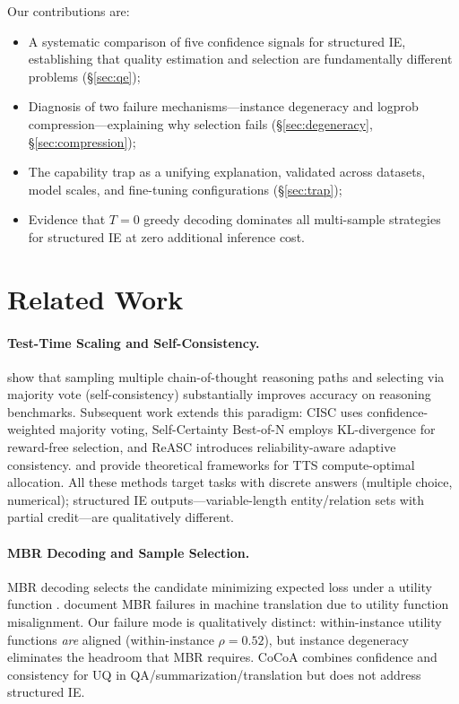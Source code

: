 \documentclass[11pt,twocolumn]{article}
\begin{document}
Our contributions are:
\begin{itemize}
\item A systematic comparison of five confidence signals for structured IE, establishing that quality estimation and selection are fundamentally different problems (\S\ref{sec:qe});
\item Diagnosis of two failure mechanisms---instance degeneracy and logprob compression---explaining why selection fails (\S\ref{sec:degeneracy}, \S\ref{sec:compression});
\item The capability trap as a unifying explanation, validated across datasets, model scales, and fine-tuning configurations (\S\ref{sec:trap});
\item Evidence that $T{=}0$ greedy decoding dominates all multi-sample strategies for structured IE at zero additional inference cost.
\end{itemize}

\section{Related Work}
\label{sec:related}

\paragraph{Test-Time Scaling and Self-Consistency.}
\citet{wang2023selfconsistency} show that sampling multiple chain-of-thought reasoning paths and selecting via majority vote (self-consistency) substantially improves accuracy on reasoning benchmarks.
Subsequent work extends this paradigm: CISC \citep{liang2025cisc} uses confidence-weighted majority voting, Self-Certainty Best-of-N \citep{zhao2026selfcertainty} employs KL-divergence for reward-free selection, and ReASC \citep{li2026reasc} introduces reliability-aware adaptive consistency.
\citet{snell2024scaling} and \citet{brown2024large} provide theoretical frameworks for TTS compute-optimal allocation.
All these methods target tasks with discrete answers (multiple choice, numerical); structured IE outputs---variable-length entity/relation sets with partial credit---are qualitatively different.

\paragraph{MBR Decoding and Sample Selection.}
MBR decoding selects the candidate minimizing expected loss under a utility function \citep{eikema2022sampling,freitag2022high}.
\citet{eikema2022sampling} document MBR failures in machine translation due to utility function misalignment.
Our failure mode is qualitatively distinct: within-instance utility functions \emph{are} aligned (within-instance $\rho{=}0.52$), but instance degeneracy eliminates the headroom that MBR requires.
CoCoA \citep{vashurin2025cocoa} combines confidence and consistency for UQ in QA/summarization/translation but does not address structured IE.
\end{document}
